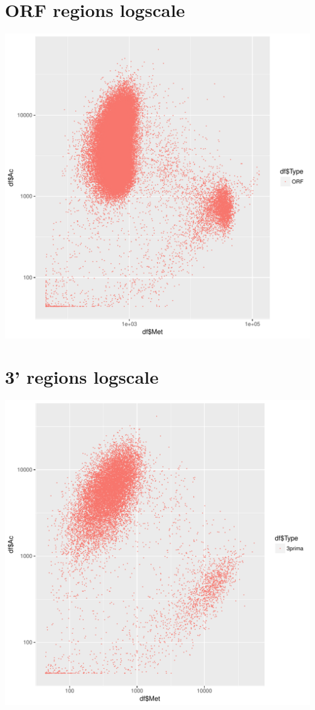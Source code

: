 \documentclass{article}\usepackage[]{graphicx}\usepackage[]{color}
\makeatletter
\def\maxwidth{ %
  \ifdim\Gin@nat@width>\linewidth
    \linewidth
  \else
    \Gin@nat@width
  \fi
}
\newenvironment{knitrout}{}{} %
\makeatother
\begin{document}
\section{ORF regions logscale}
\begin{knitrout}
\color{fgcolor}
\includegraphics[width=\maxwidth]{figure/plot_ORF_log-1} 

\end{knitrout}
\clearpage
\section{3' regions logscale}
\begin{knitrout}
\color{fgcolor}
\includegraphics[width=\maxwidth]{figure/plot_3_log-1} 

\end{knitrout}
\clearpage
\end{document}
